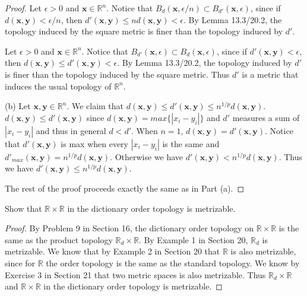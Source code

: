 \documentclass[12pt]{article}
\newenvironment{problem}[2][Problem]
{
	\begin{trivlist} 
		\item[\hskip \labelsep {\bfseries #1 #2:}]
	}
{
	\end{trivlist}
	}
\begin{document}
\begin{proof}
Let $\epsilon > 0$ and $\textbf{x} \in \mathbb{R}^n$. Notice that $B_d(\textbf{x}, \epsilon/n) \subset B_{d'}(\textbf{x}, \epsilon)$, since if $d(\textbf{x}, \textbf{y}) < \epsilon/n$, then $d'(\textbf{x}, \textbf{y}) \leq nd(\textbf{x}, \textbf{y}) < \epsilon$. By Lemma 13.3/20.2, the topology induced by the square metric is finer than the topology induced by $d'$.

Let $\epsilon > 0$ and $\textbf{x} \in \mathbb{R}^n$. Notice that $B_{d'}(\textbf{x}, \epsilon) \subset B_{d}(\textbf{x}, \epsilon)$, since if $d'(\textbf{x}, \textbf{y}) < \epsilon$, then $d(\textbf{x}, \textbf{y}) \leq d'(\textbf{x}, \textbf{y}) < \epsilon$. By Lemma 13.3/20.2, the topology induced by $d'$ is finer than the topology induced by the square metric. Thus $d'$ is a metric that induces the usual topology of $\mathbb{R}^n$.

(b) Let $\textbf{x}, \textbf{y} \in \mathbb{R}^n$. We claim that $d(\textbf{x}, \textbf{y}) \leq d'(\textbf{x}, \textbf{y}) \leq n^{1/p}d(\textbf{x}, \textbf{y})$. $d(\textbf{x}, \textbf{y}) \leq d'(\textbf{x}, \textbf{y})$ since $d(\textbf{x}, \textbf{y}) = max\{|x_i - y_i|\}$ and $d'$ measures a sum of $|x_i - y_i|$ and thus in general $d < d'$. When $n = 1$, $d(\textbf{x}, \textbf{y}) = d'(\textbf{x}, \textbf{y})$. Notice that $d'(\textbf{x}, \textbf{y})$ is max when every $|x_i - y_i|$ is the same and $d'_{max}(\textbf{x}, \textbf{y}) = n^{1/p}d(\textbf{x}, \textbf{y})$. Otherwise we have $d'(\textbf{x}, \textbf{y}) < n^{1/p}d(\textbf{x}, \textbf{y})$. Thus we have $d'(\textbf{x}, \textbf{y}) \leq n^{1/p}d(\textbf{x}, \textbf{y})$. 

The rest of the proof proceeds exactly the same as in Part (a).
\end{proof}

\begin{problem}{20.2}
Show that $\mathbb{R} \times \mathbb{R}$ in the dictionary order topology is metrizable.
\end{problem}

\begin{proof}
By Problem 9 in Section 16, the dictionary order topology on $\mathbb{R} \times \mathbb{R}$ is the same as the product topology $\mathbb{R}_d \times \mathbb{R}$. By Example 1 in Section 20, $\mathbb{R}_d$ is metrizable. We know that by Example 2 in Section 20 that $\mathbb{R}$ is also metrizable, since for $\mathbb{R}$ the order topology is the same as the standard topology. We know by Exercise 3 in Section 21 that two metric spaces is also metrizable. Thus $\mathbb{R}_d \times \mathbb{R}$ and $\mathbb{R} \times \mathbb{R}$ in the dictionary order topology is metrizable.
\end{proof}
\end{document}

